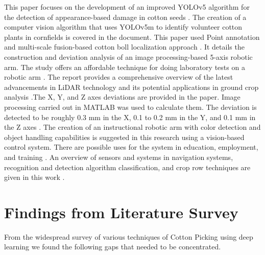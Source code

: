 \documentclass[12pt,a4paper]{report}
\begin{document}
\par This paper focuses on the development of an improved YOLOv5 algorithm for the detection of appearance-based damage in cotton seeds \cite{r16}. The creation of a computer vision algorithm that uses YOLOv5m to identify volunteer cotton plants in cornfields is covered in the document\cite{r17}. This paper used Point annotation and multi-scale fusion-based cotton boll localization approach \cite{r19}. It details the construction and deviation analysis of an image processing-based 5-axis robotic arm. The study offers an affordable technique for doing laboratory tests on a robotic arm \cite{r20}. The report provides a comprehensive overview of the latest advancements in LiDAR technology and its potential applications in ground crop analysis \cite{r23}.The X, Y, and Z axes deviations are provided in the paper. Image processing carried out in MATLAB was used to calculate them. The deviation is detected to be roughly 0.3 mm in the X, 0.1 to 0.2 mm in the Y, and 0.1 mm in the Z axes \cite{r21}. The creation of an instructional robotic arm with color detection and object handling capabilities is suggested in this research using a vision-based control system. There are possible uses for the system in education, employment, and training \cite{r22} . An overview of sensors and systems in navigation systems, recognition and detection algorithm classification, and crop row techniques are given in this work \cite{r24}.






\section {Findings from Literature Survey}
\par From the widespread survey of various techniques of Cotton Picking using deep learning we found the following gaps that needed to be concentrated.


\end{document}
